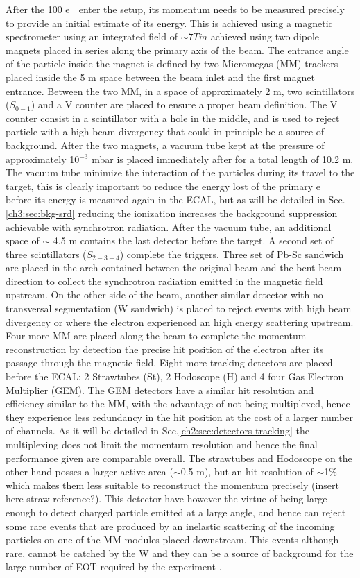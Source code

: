 After the 100 \gev e$^-$ enter the setup, its momentum needs to be measured precisely to provide an initial estimate of its energy. This is achieved using a magnetic spectrometer using an integrated field of $\sim 7 T \dot m$ achieved using two dipole magnets \cite{mbpl} placed in series along the primary axis of the beam. The entrance angle of the particle inside the magnet is defined by two Micromegas (MM) trackers placed inside the 5 m space between the beam inlet and the first magnet entrance. Between the two MM, in a space of approximately 2 m, two scintillators ($S_{0-1}$) and a V counter are placed to ensure a proper beam definition. The V counter consist in a scintillator with a hole in the middle, and is used to reject particle with a high beam divergency that could in principle be a source of background. After the two magnets, a vacuum tube kept at the pressure of approximately 10$^{-3}$ \si{mbar} is placed immediately after for a total length of 10.2 \si{m}. The vacuum tube minimize the interaction of the particles during its travel to the target, this is clearly important to reduce the energy lost of the primary e$^-$ before its energy is measured again in the ECAL, but as will be detailed in Sec.\ref{ch3:sec:bkg-srd} reducing the ionization increases the background suppression achievable with synchrotron radiation. After the vacuum tube, an additional space of $\sim$ 4.5 \si{m} contains the last detector before the target. A second set of three scintillators ($S_{2-3-4}$) complete the triggers. Three set of Pb-Sc sandwich are placed in the arch contained between the original beam and the bent beam direction to collect the synchrotron radiation emitted in the magnetic field upstream. On the other side of the beam, another similar detector with no transversal segmentation (W sandwich) is placed to reject events with high beam divergency or where the electron experienced an high energy scattering upstream. Four more MM are placed along the beam to complete the momentum reconstruction by detection the precise hit position of the electron after its passage through the magnetic field. Eight more tracking detectors are placed before the ECAL: 2 Strawtubes (St), 2 Hodoscope (H) and 4 four Gas Electron Multiplier (GEM). The GEM detectors have a similar hit resolution and efficiency similar to the MM, with the advantage of not being multiplexed, hence they experience less redundancy in the hit position at the cost of a larger number of channels. As it will be detailed in Sec.\ref{ch2:sec:detectors-tracking} the multiplexing does not limit the momentum resolution and hence the final performance given are comparable overall. The strawtubes and Hodoscope on the other hand posses a larger active area ($\sim$0.5 m), but an hit resolution of $\sim$1\% which makes them less suitable to reconstruct the momentum precisely (insert here straw reference?). This detector have however the virtue of being large enough to detect charged particle emitted at a large angle, and hence can reject some rare events that are produced by an inelastic scattering of the incoming particles on one of the MM modules placed downstream. This events although rare, cannot be catched by the W and they can be a source of background for the large number of EOT required by the experiment \cite{na64-prd}. 

